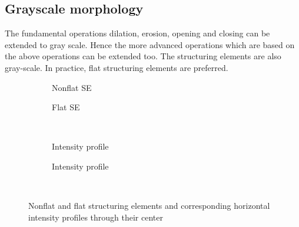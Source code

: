 \subsection{Grayscale morphology}
The fundamental operations dilation, erosion, opening and closing can be extended to gray scale. Hence the more advanced operations which are based on the above operations can be extended too. The structuring elements are also gray-scale. In practice, flat structuring elements are preferred.

\begin{figure}[h!]
\centering
\begin{subfigure}[b]{0.45\textwidth}
\centering
{}
\caption{Nonflat SE}
\end{subfigure}
\begin{subfigure}[b]{0.45\textwidth}
\centering
{}
\caption{Flat SE}
\end{subfigure}\\
\begin{subfigure}[b]{0.45\textwidth}
\centering
{}
\caption{Intensity profile}
\end{subfigure}
\begin{subfigure}[b]{0.45\textwidth}
\centering
{}
\caption{Intensity profile}
\end{subfigure}\\
\caption{Nonflat and flat structuring elements and corresponding horizontal intensity profiles through their center}
\end{figure}

